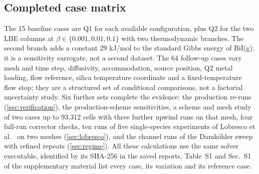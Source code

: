 \subsection{Completed case matrix}
The 15 baseline cases are Q1 for each available configuration, plus Q2
for the two LBE columns at $\beta\in\{0.001,0.01,0.1\}$ with two
thermodynamic branches. The second branch adds a constant 29 kJ/mol to
the standard Gibbs energy of BiI(g); it is a sensitivity surrogate, not
a second dataset. The 64 follow-up cases vary mesh and time step,
diffusivity, accommodation, source position, Q2 metal loading, flow
reference, silica temperature coordinate and a fixed-temperature flow
stop; they are a structured set of conditional comparisons, not a
factorial uncertainty study. Six further sets complete the evidence:
the \ProductionCases{} production re-runs (\cref{sec:verification}), the
\PSRuns{} production-scheme sensitivities, a scheme and mesh study of two
cases up to 93,312 cells with three further upwind runs on that mesh,
four full-run corrector checks, ten runs of
five single-species experiments of Lobresco et al.\
\cite{Lobresco2026assessment} on two meshes (\cref{sec:lobresco}), and
the \DaRuns{} channel runs of the Damk\"ohler sweep with
\DaRefineRuns{} refined repeats (\cref{sec:regime}). All these
calculations use the same solver executable, identified by its SHA-256
in the saved reports. Table~S1 and Sec.~S1 of the supplementary material list
every case, its variation and its reference case.
